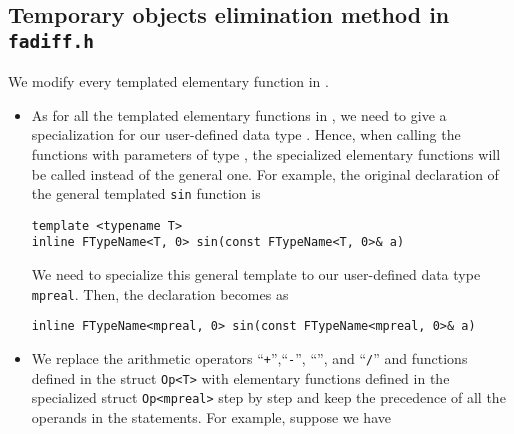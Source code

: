 \subsection{Temporary objects elimination method in \textbf\texttt{fadiff.h}}
We modify every templated elementary function in \fadiff.
\begin{itemize}
	\item As for all the templated elementary functions in \fadiff, we need to give a specialization for our user-defined data type \mpreal. Hence, when calling the functions with parameters of type \mpreal, the specialized elementary functions will be called instead of the general one. For example, the original declaration of the general templated \texttt{sin} function is
\begin{lstlisting}[numbers=none]
template <typename T>
inline FTypeName<T, 0> sin(const FTypeName<T, 0>& a)
\end{lstlisting}
	We need to specialize this general template to our user-defined data type {\tt mpreal}. Then, the declaration becomes as
\begin{lstlisting}[numbers=none]
inline FTypeName<mpreal, 0> sin(const FTypeName<mpreal, 0>& a)
\end{lstlisting}	
	\item We replace the arithmetic operators ``{\tt +}'',``{\tt -}'', ``{\tt *}'', and ``{\tt /}'' and functions defined in the struct \texttt{Op<T>} with elementary functions defined in the specialized struct \texttt{Op<mpreal>} step by step and keep the precedence of all the operands in the statements. For example, suppose we have
	

\end{itemize}
